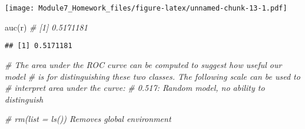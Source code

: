 \documentclass[
]{article}
\newenvironment{Shaded}{\begin{snugshade}}{\end{snugshade}}
\newcommand{\CommentTok}[1]{\textcolor[rgb]{0.56,0.35,0.01}{\textit{#1}}}
\newcommand{\FunctionTok}[1]{\textcolor[rgb]{0.00,0.00,0.00}{#1}}
\newcommand{\NormalTok}[1]{#1}
\newcommand{\OtherTok}[1]{\textcolor[rgb]{0.56,0.35,0.01}{#1}}
\begin{document}
\begin{Shaded}
\end{Shaded}

\texttt{[image: Module7\_Homework\_files/figure-latex/unnamed-chunk-13-1.pdf]}

\begin{Shaded}
\begin{Highlighting}[]
\FunctionTok{auc}\NormalTok{(r)       }\CommentTok{\# [1] 0.5171181}
\end{Highlighting}
\end{Shaded}

\begin{verbatim}
## [1] 0.5171181
\end{verbatim}

\begin{Shaded}
\begin{Highlighting}[]
\CommentTok{\# The area under the ROC curve can be computed to suggest how useful our model }
\CommentTok{\# is for distinguishing these two classes. The following scale can be used to }
\CommentTok{\# interpret area under the curve:}
\CommentTok{\#     0.517: Random model, no ability to distinguish}









\CommentTok{\# rm(list = ls())      Removes global environment}
\end{Highlighting}
\end{Shaded}
\end{document}
